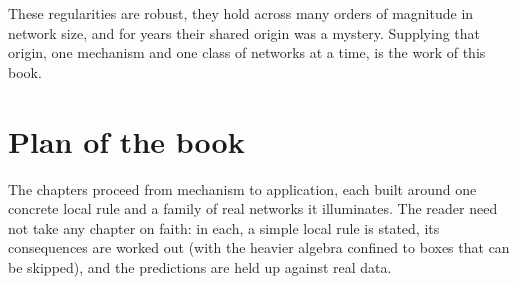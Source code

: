 These regularities are robust, they hold across many orders of magnitude in
network size, and for years their shared origin was a mystery. Supplying that
origin, one mechanism and one class of networks at a time, is the work of this
book.

\section{Plan of the book}

The chapters proceed from mechanism to application, each built around one
concrete local rule and a family of real networks it illuminates. The reader
need not take any chapter on faith: in each, a simple local rule is stated, its
consequences are worked out (with the heavier algebra confined to boxes that can
be skipped), and the predictions are held up against real data.

